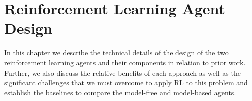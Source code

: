 \chapter{Reinforcement Learning Agent Design}
In this chapter we describe the technical details of the design of the two reinforcement learning agents and their components in relation to prior work. Further, we also discuss the relative benefits of each approach as well as the significant challenges that we must overcome to apply RL to this problem and establish the baselines to compare the model-free and model-based agents.






